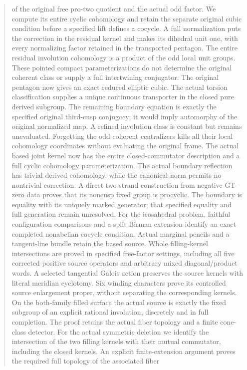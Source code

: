 \documentclass[11pt,a4paper]{article}
\begin{document}
\begin{abstract}
of the original free pro-two quotient and the actual odd factor.
We compute its entire cyclic cohomology and retain the separate
original cubic condition before a specified lift defines a cocycle.
A full normalization puts the correction in the residual kernel
and makes its dihedral unit one, with every normalizing factor
retained in the transported pentagon. The entire residual
involution cohomology is a product of the odd local unit groups.
These pointed compact parameterizations do not determine the
original coherent class or supply a full intertwining conjugator.
The original pentagon now gives an exact reduced elliptic cubic.
The actual torsion classification supplies a unique continuous
transporter in the closed pure derived subgroup. The remaining
boundary equation is exactly the specified original third-cusp
conjugacy; it would imply automorphy of the original normalized
map. A refined involution class is constant but remains unevaluated.
Forgetting the odd coherent centralizers kills all their local
cohomology coordinates without evaluating the original frame.
The actual based joint kernel now has the entire closed-commutator
description and a full cyclic cohomology parameterization. The actual
boundary reflection has trivial derived cohomology, while the canonical
norm permits no nontrivial correction. A direct two-strand construction
from negative GT-zero data proves that its noncusp fixed group is
procyclic. The boundary is equality with its uniquely marked generator;
that specified equality and full generation remain unresolved.
For the icosahedral problem, faithful configuration comparisons and a
split Birman extension identify an exact completed nonabelian cocycle
condition. Actual marginal pencils and a tangent-line bundle retain
the based source. Whole filling-kernel intersections are proved in
specified free-factor settings, including all five corrected positive
source operators and arbitrary mixed diagonal/product words. A selected
tangential Galois action preserves the source kernels with literal
meridian cyclotomy. Six winding characters prove its controlled source
enlargement proper, without separating the corresponding kernels.
On the both-family filled surface the actual source is exactly the
fixed subgroup of an explicit rational involution, discretely and in
full completion. The proof retains the actual fiber topology and a
finite cone-class detector. For the actual symmetric deletion we
identify the intersection of the two filling kernels with their mutual
commutator, including the closed kernels. An explicit finite-extension
argument proves the required full topology of the associated fiber

\end{abstract}
\end{document}
